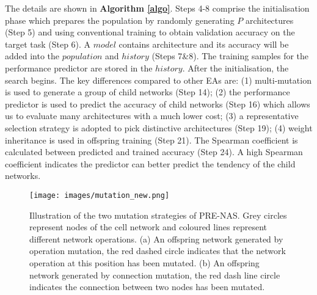 \documentclass[sigconf]{acmart}
\begin{document}
The details are shown in \textbf{Algorithm \ref{algo}}. Steps 4-8 comprise the initialisation phase which prepares the population by randomly generating $P$ architectures (Step 5) and using conventional training to obtain validation accuracy on the target task (Step 6).  A $model$ contains architecture and its accuracy will be added into the $population$ and $history$ (Steps 7\&8).   The training samples for the performance predictor are stored in the $history$.  After the initialisation, the search begins. The key differences compared to other EAs are: (1) multi-mutation is used to generate a group of child networks (Step 14); (2) the performance predictor is used to predict the accuracy of child networks (Step 16) which allows us to evaluate many architectures with a much lower cost; (3) a representative selection strategy is adopted to pick distinctive architectures (Step 19); (4) weight inheritance is used in offspring training (Step 21). The Spearman coefficient is calculated between predicted and trained accuracy (Step 24).  A high Spearman coefficient indicates the predictor can better predict the tendency of the child networks.
 
  \begin{figure}[!h]
    \begin{center}
  	\texttt{[image: images/mutation\_new.png]}
  	\caption{Illustration of the two mutation strategies of PRE-NAS.  Grey circles represent nodes of the cell network and coloured lines represent different network operations. (a) An offspring network generated by operation mutation, the red dashed circle indicates that the network operation at this position has been mutated. (b) An offspring network generated by connection mutation, the red dash line circle indicates the connection between two nodes has been mutated.}
  	\label{mutation}
  	\end{center}
\end{figure} 
\end{document}
